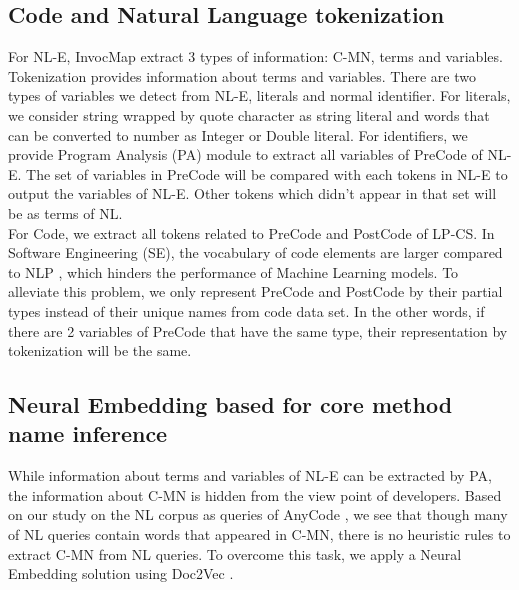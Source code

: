 \documentclass[sigconf,review,anonymous]{article}
\begin{document}
\subsection{Code and Natural Language tokenization}
For NL-E, InvocMap extract 3 types of information: C-MN, terms and variables. Tokenization provides information about terms and variables. There are two types of variables we detect from NL-E, literals and normal identifier. For literals, we consider string wrapped by quote character as string literal and words that can be converted to number as Integer or Double literal. For identifiers, we provide Program Analysis (PA) module to extract all variables of PreCode of NL-E. The set of variables in PreCode will be compared with each tokens in NL-E to output the variables of NL-E. Other tokens which didn't appear in that set will be as terms of NL.
\\
For Code, we extract all tokens related to PreCode and PostCode of LP-CS. In  Software Engineering (SE), the vocabulary of code elements are larger compared to NLP \cite{013}, which hinders the performance of Machine Learning models. To alleviate this problem, we only represent PreCode and PostCode by their partial types instead of their unique names from code data set. In the other words, if there are 2 variables of PreCode that have the same type, their representation by tokenization will be the same.

\subsection{Neural Embedding based for core method name inference}
While information about terms and variables of NL-E can be extracted by PA, the information about C-MN is hidden from the view point of developers. Based on our study on the NL corpus as queries of AnyCode \cite{007}, we see that though many of NL queries contain words that appeared in C-MN, there is no heuristic rules to extract C-MN from NL queries. To overcome this task, we apply a Neural Embedding solution using Doc2Vec \cite{002}.
\end{document}
